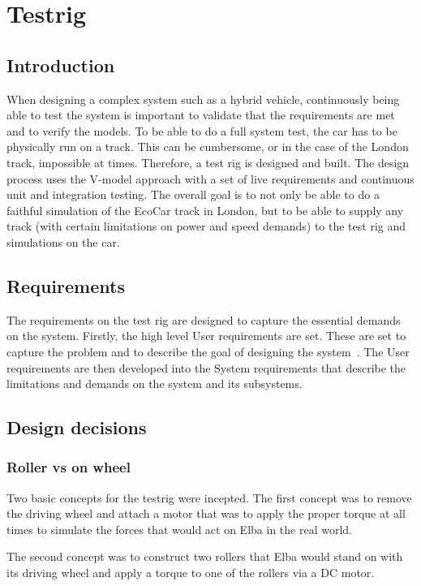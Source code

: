 ﻿\chapter{Testrig}
\section{Introduction}
When designing a complex system such as a hybrid vehicle, continuously being
able to test the system is important to validate that the requirements are met
and to verify the models. To be able to do a full system test, the car has to be
physically run on a track. This can be cumbersome, or in the case of the London
track, impossible at times. Therefore, a test rig is designed and built. The
design process uses the V-model approach with a set of live requirements and
continuous unit and integration testing. The overall goal is to not only be able
to do a faithful simulation of the EcoCar track in London, but to be able to
supply any track (with certain limitations on power and speed demands) to the
test rig and simulations on the car.

\section{Requirements}
The requirements on the test rig are designed to capture the essential demands
on the system. Firstly, the high level User requirements are set. These are set
to capture the problem and to describe the goal of designing the
system~\cite{ibm_req}. The User requirements are then developed into the System
requirements that describe the limitations and demands on the system and its
subsystems.

\section{Design decisions}
\subsection{Roller vs on wheel}
Two basic concepts for the testrig were incepted. The first concept was to remove the driving wheel and attach a motor that was to apply the proper torque at all times to simulate the forces that would act on Elba in the real world.

The second concept was to construct two rollers that Elba would stand on with its driving wheel and apply a torque to one of the rollers via a DC motor.

